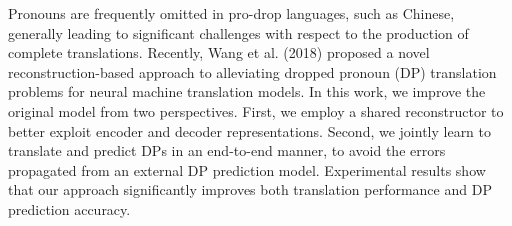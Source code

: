 Pronouns are frequently omitted in pro-drop languages, such as Chinese, generally leading to significant challenges with respect to the production of complete translations. Recently, Wang et al. (2018) proposed a novel reconstruction-based approach to alleviating dropped pronoun (DP) translation problems for neural machine translation models. In this work, we improve the original model from two perspectives. First, we employ a shared reconstructor to better exploit encoder and decoder representations. Second, we jointly learn to translate and predict DPs in an end-to-end manner, to avoid the errors propagated from an external DP prediction model. Experimental results show that our approach significantly improves both translation performance and DP prediction accuracy.
